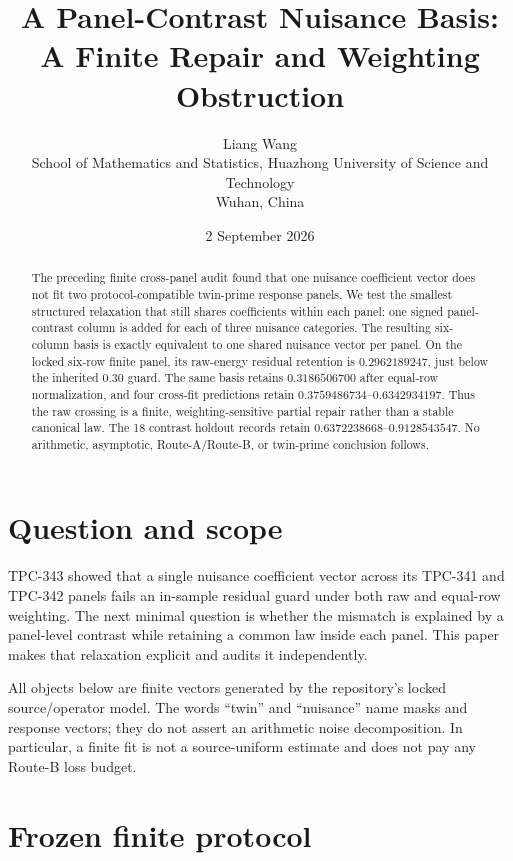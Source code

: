 \documentclass[11pt]{article}
\title{A Panel-Contrast Nuisance Basis:\\
       A Finite Repair and Weighting Obstruction}
\author{Liang Wang\\
School of Mathematics and Statistics, Huazhong University of Science and Technology\\
Wuhan, China}
\date{2 September 2026}
\begin{document}
\maketitle

\begin{abstract}
The preceding finite cross-panel audit found that one nuisance coefficient
vector does not fit two protocol-compatible twin-prime response panels.  We
test the smallest structured relaxation that still shares coefficients within
each panel: one signed panel-contrast column is added for each of three
nuisance categories.  The resulting six-column basis is exactly equivalent to
one shared nuisance vector per panel.  On the locked six-row finite panel, its
raw-energy residual retention is $0.2962189247$, just below the inherited
$0.30$ guard.  The same basis retains $0.3186506700$ after equal-row
normalization, and four cross-fit predictions retain
$0.3759486734$--$0.6342934197$.  Thus the raw crossing is a finite,
weighting-sensitive partial repair rather than a stable canonical law.  The
18 contrast holdout records retain $0.6372238668$--$0.9128543547$.  No
arithmetic, asymptotic, Route-A/Route-B, or twin-prime conclusion follows.
\end{abstract}

\section{Question and scope}

TPC-343 showed that a single nuisance coefficient vector across its TPC-341
and TPC-342 panels fails an in-sample residual guard under both raw and
equal-row weighting.  The next minimal question is whether the mismatch is
explained by a panel-level contrast while retaining a common law inside each
panel.  This paper makes that relaxation explicit and audits it independently.

All objects below are finite vectors generated by the repository's locked
source/operator model.  The words \textquotedblleft twin\textquotedblright{}
and \textquotedblleft nuisance\textquotedblright{} name masks and response
vectors; they do not assert an arithmetic noise decomposition.  In
particular, a finite fit is not a source-uniform estimate and does not pay any
Route-B loss budget.

\section{Frozen finite protocol}
\end{document}
